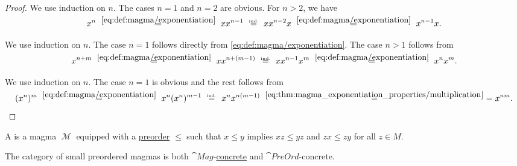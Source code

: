 \begin{proof}
   We use induction on \( n \). The cases \( n = 1 \) and \( n = 2 \) are obvious. For \( n > 2 \), we have
  \begin{equation*}
    x^n
    \reloset {\eqref{eq:def:magma/exponentiation}} =
    x x^{n-1}
    \reloset {\T{ind.}} =
    x x^{n-2} x
    \reloset {\eqref{eq:def:magma/exponentiation}} =
    x^{n-1} x.
  \end{equation*}

   We use induction on \( n \). The case \( n = 1 \) follows directly from \eqref{eq:def:magma/exponentiation}. The case \( n > 1 \) follows from
  \begin{equation*}
    x^{n + m}
    \reloset {\eqref{eq:def:magma/exponentiation}} =
    x x^{n + (m - 1)}
    \reloset {\T{ind.}} =
    x x^{n-1} x^m
    \reloset {\eqref{eq:def:magma/exponentiation}} =
    x^n x^m.
  \end{equation*}

   We use induction on \( n \). The case \( n = 1 \) is obvious and the rest follows from
  \begin{equation*}
    (x^n)^m
    \reloset {\eqref{eq:def:magma/exponentiation}} =
    x^n (x^n)^{m-1}
    \reloset {\T{ind.}} =
    x^n x^{n (m - 1)}
    \reloset {\eqref{eq:thm:magma_exponentiation_properties/multiplication}} =
    =
    x^{nm}.
  \end{equation*}
\end{proof}

\begin{definition}\label{def:preordered_magma}
  A  is a magma \( \mscrM \) equipped with a \hyperref[def:preordered_set]{preorder} \( \leq \) such that \( x \leq y \) implies \( xz \leq yz \) and \( zx \leq zy \) for all \( z \in M \).

  The category of small preordered magmas is both \hyperref[def:magma/category]{\( \cat{Mag} \)}-\hyperref[def:concrete_category]{concrete} and \hyperref[def:preordered_set/category]{\( \cat{PreOrd} \)}-concrete.
\end{definition}

